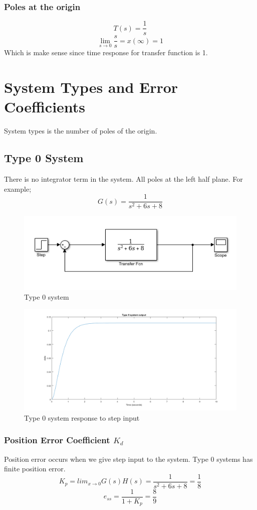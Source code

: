 \documentclass[11pt]{article}
\begin{document}
\subsubsection*{Poles at the origin}
$$T(s)=\frac{1}{s}$$
$$\lim_{s\to 0}\frac{s}{s}=x(\infty)=1$$
Which is make sense since time response for transfer function is 1.
\section*{System Types and Error Coefficients}
System types is the number of poles of the origin.
\subsection*{Type 0 System}
There is no integrator term in the system. All poles at the left half plane. For example;
$$G(s)=\frac{1}{s^2+6s+8}$$
\begin{figure}[H]
\centering
  \includegraphics[scale=1]{type0}
  \caption{Type 0 system}
  \label{fig:zero}
\end{figure}
\begin{figure}[H]
\centering
  \includegraphics[scale=0.35]{type0response}
  \caption{Type 0 system response to step input}
  \label{fig:zero}
\end{figure}

\subsubsection*{Position Error Coefficient $K_d$}
Position error occurs when we give step input to the system. Type 0 systems has finite position error. 
$$K_p=lim_{x \to 0}G(s)H(s)=\frac{1}{s^2+6s+8}=\frac{1}{8}$$
$$e_{ss}=\frac{1}{1+K_p}=\frac{8}{9}$$
\end{document}
